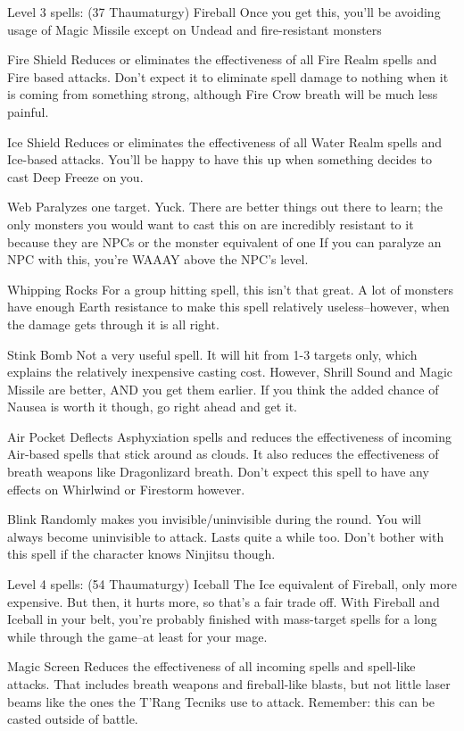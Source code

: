 \documentclass[12pt]{article}
\begin{document}
Level 3 spells: (37 Thaumaturgy) Fireball Once you get this, you'll be
avoiding usage of Magic Missile except on Undead and fire-resistant
monsters

Fire Shield Reduces or eliminates the effectiveness of all Fire Realm
spells and Fire based attacks. Don't expect it to eliminate spell damage
to nothing when it is coming from something strong, although Fire Crow
breath will be much less painful.

Ice Shield Reduces or eliminates the effectiveness of all Water Realm
spells and Ice-based attacks. You'll be happy to have this up when
something decides to cast Deep Freeze on you.

Web Paralyzes one target. Yuck. There are better things out there to
learn; the only monsters you would want to cast this on are incredibly
resistant to it because they are NPCs or the monster equivalent of one
If you can paralyze an NPC with this, you're WAAAY above the NPC's
level.

Whipping Rocks For a group hitting spell, this isn't that great. A lot
of monsters have enough Earth resistance to make this spell relatively
useless--however, when the damage gets through it is all right.

Stink Bomb Not a very useful spell. It will hit from 1-3 targets only,
which explains the relatively inexpensive casting cost. However, Shrill
Sound and Magic Missile are better, AND you get them earlier. If you
think the added chance of Nausea is worth it though, go right ahead and
get it.

Air Pocket Deflects Asphyxiation spells and reduces the effectiveness of
incoming Air-based spells that stick around as clouds. It also reduces
the effectiveness of breath weapons like Dragonlizard breath. Don't
expect this spell to have any effects on Whirlwind or Firestorm however.

Blink Randomly makes you invisible/uninvisible during the round. You
will always become uninvisible to attack. Lasts quite a while too. Don't
bother with this spell if the character knows Ninjitsu though.

Level 4 spells: (54 Thaumaturgy) Iceball The Ice equivalent of Fireball,
only more expensive. But then, it hurts more, so that's a fair trade
off. With Fireball and Iceball in your belt, you're probably finished
with mass-target spells for a long while through the game--at least for
your mage.

Magic Screen Reduces the effectiveness of all incoming spells and
spell-like attacks. That includes breath weapons and fireball-like
blasts, but not little laser beams like the ones the T'Rang Tecniks use
to attack. Remember: this can be casted outside of battle.
\end{document}
